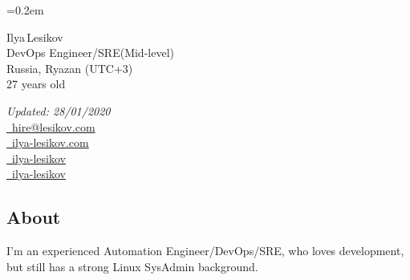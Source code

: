 \documentclass[11pt, a4paper]{article}
\newcommand{\Delimitline}{
  \vspace{-2ex}
  \noindent\makebox[\linewidth]{\rule{\DelimitlineLength}{0.12ex}} }
\newcommand{\forceindent}{\leavevmode{\parindent=1em\indent}}
\begin{document}
\sffamily

\font=0.2em

\newlength{\DelimitlineLength}
\setlength{\DelimitlineLength}{\textwidth+1em}

\pagecolor[RGB]{245,245,245}


{\setlength\multicolsep{0pt}\begin{multicols}{2}
    \begin{spacing}{1.6}\raggedright\rmfamily
    {\huge Ilya\,Lesikov}\\[1.8ex]
    {\Large DevOps Engineer/SRE\hspace{0.35em}(Mid-level)}\\
    {\Large Russia, Ryazan (UTC+3)}\\
    {\Large 27 years old}
  \end{spacing}

  \columnbreak

  \begin{flushright}\begin{spacing}{1.3}\rmfamily
    \textit{Updated: 28/01/2020}\\[0.5ex]
    \large{
      \faEnvelope \href{mailto:hire@lesikov.com}{\ hire@lesikov.com}\\
      \faInternetExplorer \href{https://ilya-lesikov.com}{\ ilya-lesikov.com}\\
      \faLinkedin \href{https://www.linkedin.com/in/ilya-lesikov}{\ ilya-lesikov}\\
      \faGithubAlt \href{https://github.com/ilya-lesikov}{\ ilya-lesikov}}
  \end{spacing}\end{flushright}
\end{multicols}}

\vspace{2ex}


\subsection*{About}
\Delimitline

\forceindent I'm an experienced Automation Engineer/DevOps/SRE, who loves development, but still has a strong Linux SysAdmin background.
\end{document}

